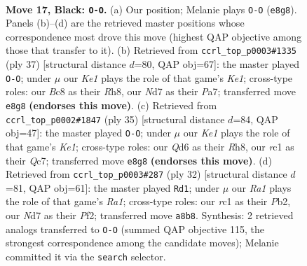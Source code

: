 \documentclass[11pt]{article}
\begin{document}
\clearpage

\begin{figure}[p]\centering
\begin{subfigure}{0.46\textwidth}\centering
\resizebox{\linewidth}{!}{%
\newchessgame
\chessboard[
  setfen={r1b1k2r/pp1n3p/2pq2p1/3p2p1/3P4/2NBP1P1/PP3P1P/2RQR1K1 b k - 0 17},
  showmover=false,
  pgfstyle=straightmove, color=movearrow, markmove={e8-g8}
]}
\caption{}
\end{subfigure}\hfill
\begin{subfigure}{0.46\textwidth}\centering
\resizebox{\linewidth}{!}{%
\newchessgame
\chessboard[
  setfen={r1b1k2r/p3qpb1/1pp4p/6p1/3pP3/3P1NBP/PPP3P1/R1Q2RK1 b kq - 1 19},
  showmover=false,
  pgfstyle=straightmove, color=movearrow, markmove={e8-g8}
]}
\caption{}
\end{subfigure}
\\[4pt]
\begin{subfigure}{0.46\textwidth}\centering
\resizebox{\linewidth}{!}{%
\newchessgame
\chessboard[
  setfen={r3k2r/1pqnbpp1/p1p4p/2P5/PP1Pp3/7P/1N1B1PP1/R2Q1RK1 b kq - 0 18},
  showmover=false,
  pgfstyle=straightmove, color=movearrow, markmove={e8-g8}
]}
\caption{}
\end{subfigure}\hfill
\begin{subfigure}{0.46\textwidth}\centering
\resizebox{\linewidth}{!}{%
\newchessgame
\chessboard[
  setfen={r2q1rk1/p2n1pnp/1pp3p1/3pP3/6P1/PQN1P1BP/1P3P2/R4K1R w - - 3 17},
  showmover=false,
  pgfstyle=straightmove, color=movearrow, markmove={a1-d1}
]}
\caption{}
\end{subfigure}
\caption{\textbf{Move 17, Black: \texttt{O-O}.} (a) Our position; Melanie plays \texttt{O-O} (\texttt{e8g8}). Panels (b)--(d) are the retrieved master positions whose correspondence most drove this move (highest QAP objective among those that transfer to it). (b) Retrieved from \texttt{ccrl\_top\_p0003\#1335} (ply 37) [structural distance $d$=80, QAP obj=67]: the master played \texttt{O-O}; under $\mu$ our \emph{Ke1} plays the role of that game's \emph{Ke1}; cross-type roles: our \emph{B}c8 as their \emph{R}h8, our \emph{N}d7 as their \emph{P}a7; transferred move \texttt{e8g8} \textbf{(endorses this move)}. (c) Retrieved from \texttt{ccrl\_top\_p0002\#1847} (ply 35) [structural distance $d$=84, QAP obj=47]: the master played \texttt{O-O}; under $\mu$ our \emph{Ke1} plays the role of that game's \emph{Ke1}; cross-type roles: our \emph{Q}d6 as their \emph{R}h8, our \emph{r}c1 as their \emph{Q}c7; transferred move \texttt{e8g8} \textbf{(endorses this move)}. (d) Retrieved from \texttt{ccrl\_top\_p0003\#287} (ply 32) [structural distance $d$=81, QAP obj=61]: the master played \texttt{Rd1}; under $\mu$ our \emph{Ra1} plays the role of that game's \emph{Ra1}; cross-type roles: our \emph{r}c1 as their \emph{P}b2, our \emph{N}d7 as their \emph{P}f2; transferred move \texttt{a8b8}. Synthesis: 2 retrieved analogs transferred to \texttt{O-O} (summed QAP objective 115, the strongest correspondence among the candidate moves); Melanie committed it via the \texttt{search} selector.}
\label{fig:thought-m33}
\end{figure}
\end{document}
